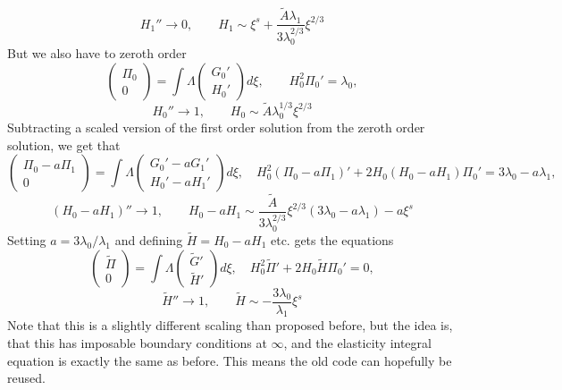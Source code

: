 \documentclass{article}
\begin{document}
\[ H_1'' \to 0, \qquad H_1 \sim \xi^s + \frac{\tilde{A} \lambda_1}{3 
\lambda_0^{2/3}} \xi^{2/3} \]
But we also have to zeroth order
\[ \left( \begin{array}{c} \Pi_0 \\ 0 \end{array} \right)
= \int \Lambda 
 \left( \begin{array}{c} G_0' \\ H_0' \end{array} \right) d\xi, \qquad
H_0^2 \Pi_0' = \lambda_0, \] 
\[ H_0'' \to 1, \qquad H_0 \sim \tilde{A} \lambda_0^{1/3} \xi^{2/3} \]
Subtracting a scaled version of the first order solution from the zeroth
order solution, we get that
\[ \left( \begin{array}{c} \Pi_0 - a \Pi_1 \\ 0 \end{array} \right)
= \int \Lambda 
 \left( \begin{array}{c} G_0'- aG_1' \\ H_0'-aH_1' \end{array} \right) d\xi, 
\quad H_0^2 (\Pi_0-a\Pi_1)'+2H_0(H_0 - a H_1)\Pi_0' = 3\lambda_0 - 
a \lambda_1, \] 
\[ (H_0-aH_1)'' \to 1, \qquad H_0 - a H_1 \sim 
\frac{\tilde{A}}{3 \lambda_0^{2/3}} \xi^{2/3}(3\lambda_0 - a\lambda_1) 
- a \xi^s\]
Setting $a = 3\lambda_0/\lambda_1$ and defining $\tilde{H} = 
H_0 - a H_1$ etc. gets the equations 
\[ \left( \begin{array}{c} \tilde{\Pi} \\ 0 \end{array} \right)
= \int \Lambda 
 \left( \begin{array}{c} \tilde{G}' \\ \tilde{H}' \end{array} \right) d\xi, 
\quad H_0^2 \tilde{\Pi}'+2H_0\tilde{H}\Pi_0' = 0, \] 
\[ \tilde{H}'' \to 1, \qquad \tilde{H} \sim - \frac{3\lambda_0}{\lambda_1} 
\xi^s \]
Note that this is a slightly different scaling than proposed before, but 
the idea is, that this has imposable boundary conditions at $\infty$, and
the elasticity integral equation is exactly the same as before. This means
the old code can hopefully be reused.
\end{document}
